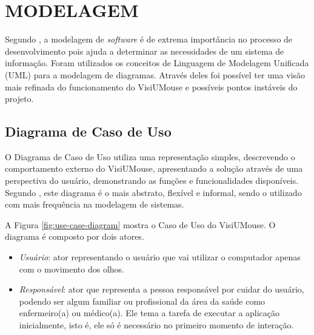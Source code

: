 \chapter{MODELAGEM}\label{CAP5}

Segundo , a modelagem de \textit{software} é de extrema importância no processo de desenvolvimento pois ajuda a determinar as necessidades de um sistema de informação. Foram utilizados os conceitos de Linguagem de Modelagem Unificada (UML) para a modelagem de diagramas. Através deles foi possível ter uma visão mais refinada do funcionamento do VisiUMouse e possíveis pontos instáveis do projeto.

\section{Diagrama de Caso de Uso}
O Diagrama de Caso de Uso utiliza uma representação simples, descrevendo o comportamento externo do VisiUMouse, apresentando a solução através de uma perspectiva do usuário, demonstrando as funções e funcionalidades disponíveis. Segundo , este diagrama é o mais abstrato, flexível e informal, sendo o utilizado com mais frequência na modelagem de sistemas.%

A Figura \ref{fig:use-case-diagram} mostra o Caso de Uso do VisiUMouse. O diagrama é composto por dois atores. 
\begin{itemize}
\item \textit{Usuário}: ator representando o usuário que vai utilizar o computador apenas com o movimento dos olhos. %

\item  \textit{Responsável}: ator que representa a pessoa responsável por cuidar do usuário, podendo ser algum familiar ou profissional da área da saúde como enfermeiro(a) ou médico(a). Ele tema a tarefa de executar a aplicação inicialmente, isto é, ele só é necessário no primeiro momento de interação. 

\end{itemize}


